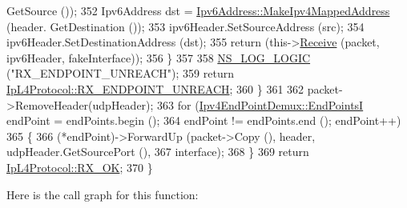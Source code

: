 \begin{DoxyCode}
      GetSource ());
352           Ipv6Address dst = \hyperlink{classns3_1_1Ipv6Address_ae2db372827002d9791dec4edb6925021}{Ipv6Address::MakeIpv4MappedAddress} (header.
      GetDestination ());
353           ipv6Header.SetSourceAddress (src);
354           ipv6Header.SetDestinationAddress (dst);
355           \textcolor{keywordflow}{return} (this->\hyperlink{classns3_1_1UdpL4Protocol_a61e0744cc561ec265c8a888552e27310}{Receive} (packet, ipv6Header, fakeInterface));
356         \}
357 
358       \hyperlink{group__logging_ga88acd260151caf2db9c0fc84997f45ce}{NS\_LOG\_LOGIC} (\textcolor{stringliteral}{"RX\_ENDPOINT\_UNREACH"});
359       \textcolor{keywordflow}{return} \hyperlink{classns3_1_1IpL4Protocol_afd3744c89902fff232e2fd45f558c80ea00e3d2a534b8bd353395254c0735948b}{IpL4Protocol::RX\_ENDPOINT\_UNREACH};
360     \}
361 
362   packet->RemoveHeader(udpHeader);
363   \textcolor{keywordflow}{for} (\hyperlink{classns3_1_1Ipv4EndPointDemux_ad3ce6fd3c128dcb46d10d562c82b4e07}{Ipv4EndPointDemux::EndPointsI} endPoint = endPoints.begin ();
364        endPoint != endPoints.end (); endPoint++)
365     \{
366       (*endPoint)->ForwardUp (packet->Copy (), header, udpHeader.GetSourcePort (), 
367                               interface);
368     \}
369   \textcolor{keywordflow}{return} \hyperlink{classns3_1_1IpL4Protocol_afd3744c89902fff232e2fd45f558c80eabd979bce2f3b22521c81c4115c66317e}{IpL4Protocol::RX\_OK};
370 \}
\end{DoxyCode}


Here is the call graph for this function\+:


